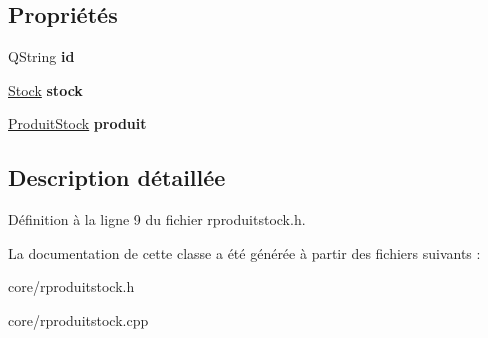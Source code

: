 \subsection*{Propriétés}
\begin{DoxyCompactItemize}
\item 
\hypertarget{class_core_1_1_r_produit_stock_a48b9c66f04252b177f8c5f065c5eb47b}{
QString {\bfseries id}}
\label{d1/da9/class_core_1_1_r_produit_stock_a48b9c66f04252b177f8c5f065c5eb47b}

\item 
\hypertarget{class_core_1_1_r_produit_stock_ab988f08c75b5ad3d6eb61c46c55f9e42}{
\hyperlink{class_core_1_1_stock}{Stock} {\bfseries stock}}
\label{d1/da9/class_core_1_1_r_produit_stock_ab988f08c75b5ad3d6eb61c46c55f9e42}

\item 
\hypertarget{class_core_1_1_r_produit_stock_a2e242532e943af64cd35f83e53eb8d94}{
\hyperlink{class_core_1_1_produit_stock}{ProduitStock} {\bfseries produit}}
\label{d1/da9/class_core_1_1_r_produit_stock_a2e242532e943af64cd35f83e53eb8d94}

\end{DoxyCompactItemize}


\subsection{Description détaillée}


Définition à la ligne 9 du fichier rproduitstock.h.



La documentation de cette classe a été générée à partir des fichiers suivants :\begin{DoxyCompactItemize}
\item 
core/rproduitstock.h\item 
core/rproduitstock.cpp\end{DoxyCompactItemize}
